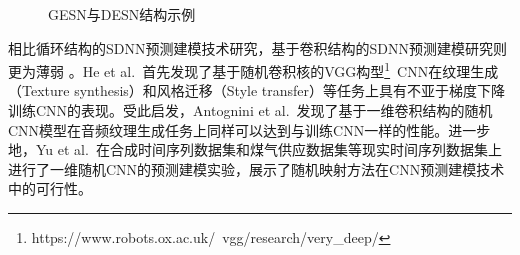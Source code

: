 \begin{figure}[t!]
    \caption{\label{fig:ch.intro.esns} GESN与DESN结构示例}
\end{figure}

相比循环结构的SDNN预测建模技术研究，基于卷积结构的SDNN预测建模研究则更为薄弱 。He et al.~\cite{hePowerful2016}首先发现了基于随机卷积核的VGG构型\footnote{{https://www.robots.ox.ac.uk/~vgg/research/very\_deep/}}~\cite{simonyanVery2015}CNN在纹理生成（Texture synthesis）和风格迁移（Style transfer）等任务上具有不亚于梯度下降训练CNN的表现。受此启发，Antognini et al.~\cite{antogniniAudio2019}发现了基于一维卷积结构的随机CNN模型在音频纹理生成任务上同样可以达到与训练CNN一样的性能。进一步地，Yu et al.~\cite{yuImpact2019}在合成时间序列数据集和煤气供应数据集等现实时间序列数据集上进行了一维随机CNN的预测建模实验，展示了随机映射方法在CNN预测建模技术中的可行性。

